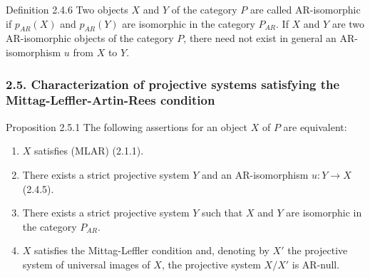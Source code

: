 \begin{statement}{Definition 2.4.6}
Two objects $X$ and $Y$ of the category $P$ are called AR-isomorphic if $p_{AR}(X)$ and $p_{AR}(Y)$ are isomorphic in the category $P_{AR}$. If $X$ and $Y$ are two AR-isomorphic objects of the category $P$, there need not exist in general an AR-isomorphism $u$ from $X$ to $Y$.
\end{statement}

\subsubsection*{2.5. Characterization of projective systems satisfying the Mittag-Leffler-Artin-Rees condition}
\begin{statement}{Proposition 2.5.1}
The following assertions for an object $X$ of $P$ are equivalent:
\begin{enumerate}[label=(\roman*)]
\item $X$ satisfies (MLAR) (2.1.1).
\item There exists a strict projective system $Y$ and an AR-isomorphism $u:Y\to X$ (2.4.5).
\item There exists a strict projective system $Y$ such that $X$ and $Y$ are isomorphic in the category $P_{AR}$.
\item $X$ satisfies the Mittag-Leffler condition and, denoting by $X'$ the projective system of universal images of $X$, the projective system $X/X'$ is AR-null.
\end{enumerate}
\end{statement}

